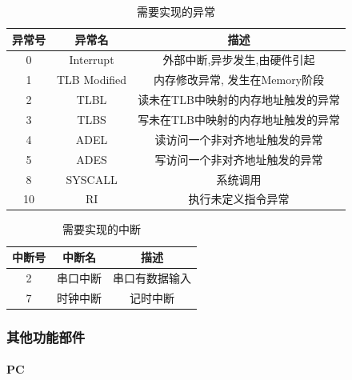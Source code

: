            \begin{table}
            \centering
            \caption{需要实现的异常}
            \begin{tabular}{|c|c|c|}
            \hline
            异常号 & 异常名 & 描述 \\
            \hline
            0 & Interrupt & 外部中断,异步发生,由硬件引起 \\
            \hline
            1 & TLB Modified & 内存修改异常, 发生在Memory阶段 \\
            \hline
            2 & TLBL & 读未在TLB中映射的内存地址触发的异常 \\
            \hline
            3 & TLBS & 写未在TLB中映射的内存地址触发的异常 \\
            \hline
            4 & ADEL & 读访问一个非对齐地址触发的异常 \\
            \hline
            5 & ADES & 写访问一个非对齐地址触发的异常 \\
            \hline
            8 & SYSCALL & 系统调用 \\
            \hline
            10 & RI & 执行未定义指令异常 \\
            \hline
            \end{tabular}
            \end{table}

                        \begin{table}
            \centering
            \caption{需要实现的中断}
            \begin{tabular}{|c|c|c|}
            \hline
            中断号 & 中断名 & 描述 \\
            \hline
            2 & 串口中断 & 串口有数据输入 \\
            \hline
            7 & 时钟中断 & 记时中断 \\
            \hline
            \end{tabular}
            \end{table}

        \subsubsection{其他功能部件}
            \paragraph{PC}
                \mbox{} \\ 


